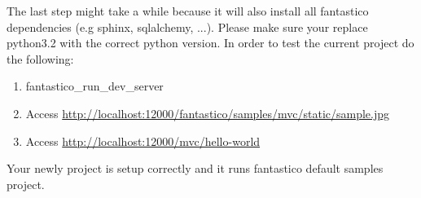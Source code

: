 \documentclass[letterpaper,10pt,english]{sphinxmanual}
\begin{document}
The last step might take a while because it will also install all fantastico dependencies (e.g sphinx, sqlalchemy, ...).
Please make sure your replace python3.2 with the correct python version.
In order to test the current project do the following:
\begin{enumerate}
\item {} 
fantastico\_run\_dev\_server

\item {} 
Access \href{http://localhost:12000/fantastico/samples/mvc/static/sample.jpg}{http://localhost:12000/fantastico/samples/mvc/static/sample.jpg}

\item {} 
Access \href{http://localhost:12000/mvc/hello-world}{http://localhost:12000/mvc/hello-world}

\end{enumerate}

Your newly project is setup correctly and it runs fantastico default samples project.
\end{document}
